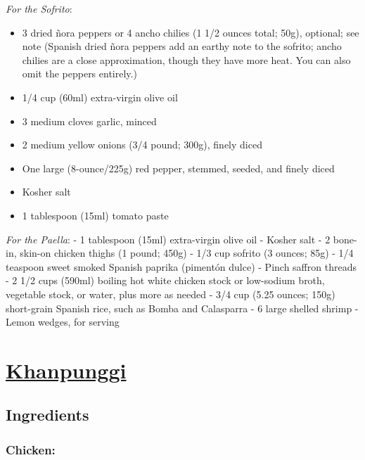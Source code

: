 \documentclass[]{article}
\providecommand{\tightlist}{%
  \setlength{\itemsep}{0pt}\setlength{\parskip}{0pt}}
\begin{document}
\emph{For the Sofrito}:

\begin{itemize}
\tightlist
\item
  3 dried ñora peppers or 4 ancho chilies (1 1/2 ounces total; 50g), optional; see note (Spanish dried ñora peppers add an earthy note to the sofrito; ancho chilies are a close approximation, though they have more heat. You can also omit the peppers entirely.)
\item
  1/4 cup (60ml) extra-virgin olive oil
\item
  3 medium cloves garlic, minced
\item
  2 medium yellow onions (3/4 pound; 300g), finely diced
\item
  One large (8-ounce/225g) red pepper, stemmed, seeded, and finely diced
\item
  Kosher salt
\item
  1 tablespoon (15ml) tomato paste
\end{itemize}

\emph{For the Paella}:
- 1 tablespoon (15ml) extra-virgin olive oil
- Kosher salt
- 2 bone-in, skin-on chicken thighs (1 pound; 450g)
- 1/3 cup sofrito (3 ounces; 85g)
- 1/4 teaspoon sweet smoked Spanish paprika (pimentón dulce)
- Pinch saffron threads
- 2 1/2 cups (590ml) boiling hot white chicken stock or low-sodium broth, vegetable stock, or water, plus more as needed
- 3/4 cup (5.25 ounces; 150g) short-grain Spanish rice, such as Bomba and Calasparra
- 6 large shelled shrimp
- Lemon wedges, for serving

\hypertarget{khanpunggi}{%
\section{\texorpdfstring{\href{https://www.maangchi.com/recipe/kkanpunggi/comment-page-3}{Khanpunggi}}{Khanpunggi}}\label{khanpunggi}}

\hypertarget{ingredients-1}{%
\subsection{Ingredients}\label{ingredients-1}}

\hypertarget{chicken}{%
\subsubsection{Chicken:}\label{chicken}}
\end{document}
